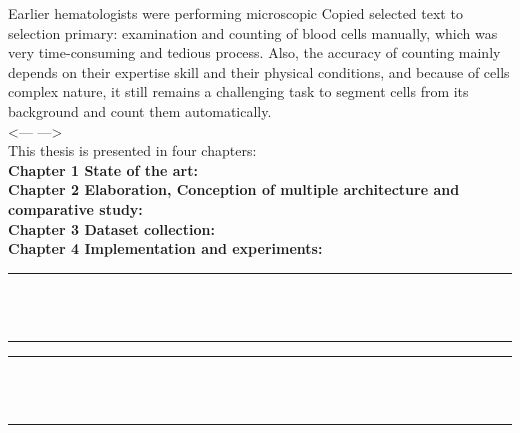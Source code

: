 \documentclass[12pt]{report}
\begin{document}
Earlier hematologists were performing microscopic Copied selected text to selection primary: examination and counting of blood cells manually, which  was very time-consuming and tedious process. Also, the accuracy of counting mainly depends on their expertise skill and their physical conditions, and because of cells complex nature, it still remains a challenging task to segment cells from its background and count them automatically.\\
<--- --->\\

This thesis is presented in four chapters:\\

\textbf{Chapter 1 State of the art:}\\
\textbf{Chapter 2 Elaboration, Conception of multiple architecture and comparative study:}\\
\textbf{Chapter 3 Dataset collection:}\\
\textbf{Chapter 4 Implementation and experiments:}\\

\newpage

\vspace*{\fill}
\begin{center}
    {\color{Black} \rule{\linewidth}{1.2mm} }\\
\vspace{0.25in}
{\centering{}}
\vspace{0.35in}\\
    {\color{Black} \rule{\linewidth}{1.2mm} }
\end{center}
\vspace*{\fill}
\setcounter{section}{0}

\newpage



\newpage

\vspace*{\fill}
\begin{center}
    {\color{Black} \rule{\linewidth}{1.2mm} }\\
\vspace{0.25in}
 {\centering{}}
\vspace{0.35in}\\
    {\color{Black} \rule{\linewidth}{1.2mm} }
\end{center}
\vspace*{\fill}
\setcounter{section}{0}
\end{document}

